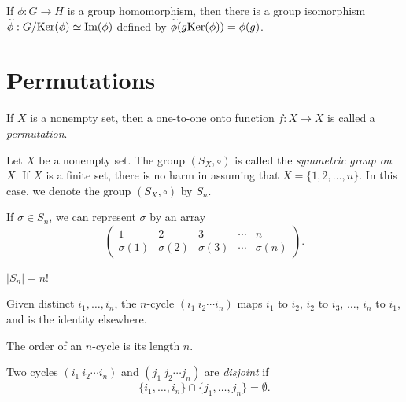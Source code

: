 \begin{theorem}
	If $\phi : G \rightarrow H$ is a group homomorphism, then there is a group
	isomorphism $\widetilde{\phi} : G/\text{Ker}(\phi) \simeq \text{Im}(\phi)$ defined
	by $\widetilde{\phi}(g \text{Ker}(\phi)) = \phi(g)$.
\end{theorem}

\section*{Permutations}

\begin{definition}
	If $X$ is a nonempty set, then a one-to-one onto function $f : X \rightarrow
	X$ is called a \emph{permutation}.
\end{definition}

\begin{definition}
	Let $X$ be a nonempty set. The group $(S_X, \circ)$ is called the
	\emph{symmetric group on $X$}. If $X$ is a finite set, there is no harm in
	assuming that $X = \{1, 2, \dots, n\}$. In this case, we denote the group
	$(S_X, \circ)$ by $S_n$.
\end{definition}

\begin{notation}
	If $\sigma \in S_n$, we can represent $\sigma$ by an array
	\[
		\begin{pmatrix}
			1 & 2 & 3 & \cdots & n \\
			\sigma(1) & \sigma(2) & \sigma(3) & \cdots & \sigma(n)
		\end{pmatrix}.
	\]
\end{notation}

\begin{fact}
	$|S_n| = n$!
\end{fact}

\begin{definition}
	Given distinct $i_1, \dots, i_n$, the $n$-cycle $(i_1 \ i_2 \cdots i_n)$ maps
	$i_1$ to $i_2$, $i_2$ to $i_3$, $\dots$, $i_n$ to $i_1$, and is the identity
	elsewhere.
\end{definition}

\begin{fact}
	The order of an $n$-cycle is its length $n$.
\end{fact}

\begin{definition}
	Two cycles $(i_1 \ i_2 \cdots i_n)$ and $(j_1 \ j_2 \cdots j_n)$ are
	\emph{disjoint} if
	\[
		\{i_1, \dots, i_n\} \cap \{j_1, \dots, j_n\} = \emptyset.
	\]
\end{definition}

